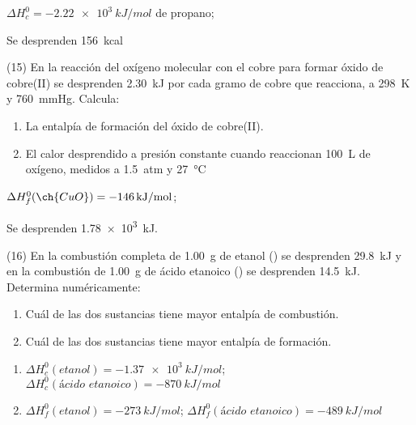 \documentclass[10pt]{article}
\begin{document}
\begin{multicols}{2}
\begin{solution}
  \begin{enumerate*}
    \item \( \Delta H^0_c = \SI{-2.22e3}{kJ/mol} \) de propano;
    \item Se desprenden \SI{156}{kcal}
  \end{enumerate*}
\end{solution}

\begin{exercise}
  (15) En la reacción del oxígeno molecular con el cobre para formar
  óxido de cobre(II) se desprenden \SI{2.30}{kJ} por cada gramo de
  cobre que reacciona, a \SI{298}{\kelvin} y \SI{760}{\mmHg}. Calcula:
  \begin{enumerate}
    \item La entalpía de formación del óxido de cobre(II).
    \item El calor desprendido a presión constante cuando reaccionan \SI{100}{\liter} de oxígeno, medidos a \SI{1.5}{atm} y \SI{27}{\celsius}
  \end{enumerate}
\end{exercise}

\begin{solution}
  \begin{enumerate*}
    \item \( \Delta H^0_f (\ch{CuO}) = \SI{-146}{kJ/mol} \);
    \item Se desprenden \SI{1.78e3}{kJ}.
  \end{enumerate*}
\end{solution}

\begin{exercise}
  (16) En la combustión completa de \SI{1.00}{\gram} de etanol () se desprenden \SI{29.8}{kJ} y en la combustión de \SI{1.00}{\gram}
  de ácido etanoico () se desprenden \SI{14.5}{kJ}.
  Determina numéricamente:
  \begin{enumerate}
    \item Cuál de las dos sustancias tiene mayor entalpía de combustión.
    \item Cuál de las dos sustancias tiene mayor entalpía de formación.
  \end{enumerate}
\end{exercise}

\begin{solution}
  \begin{enumerate}
    \item \( \Delta H^0_c (\textit{etanol}) = \SI{-1.37e3}{kJ/mol} \);
          \( \Delta H^0_c (\textit{ácido etanoico}) = \SI{-870}{kJ/mol} \)
    \item \( \Delta H^0_f (\textit{etanol}) = \SI{-273}{kJ/mol} \); \newline
          \( \Delta H^0_f (\textit{ácido etanoico}) = \SI{-489}{kJ/mol} \)
  \end{enumerate}
\end{solution}


\end{multicols}
\end{document}
